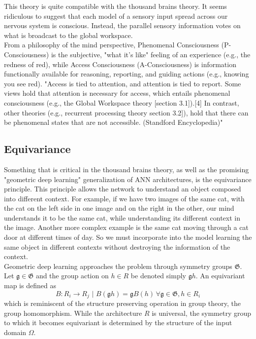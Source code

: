 \documentclass[twocolumn, 10pt]{article}
\begin{document}
This theory is quite compatible with the thousand brains theory. It seems ridiculous to suggest that each model of a sensory input spread across our nervous system is conscious. Instead, the parallel sensory information votes on what is broadcast to the global workspace. \\

From a philosophy of the mind perspective, Phenomenal Consciousness (P-Consciousness) is the subjective, "what it's like" feeling of an experience (e.g., the redness of red), while Access Consciousness (A-Consciousness) is information functionally available for reasoning, reporting, and guiding actions (e.g., knowing you see red). "Access is tied to attention, and attention is tied to report. Some views hold that attention is necessary for access, which entails phenomenal consciousness (e.g., the Global Workspace theory [section 3.1]).[4] In contrast, other theories (e.g., recurrent processing theory section 3.2]), hold that there can be phenomenal states that are not accessible. (Standford Encyclopedia)"

\subsection{Equivariance}
Something that is critical in the thousand brains theory, as well as the promising "geometric deep learning" generalization of ANN architectures, is the equivariance principle. This principle allows the network to understand an object composed into different context. For example, if we have two images of the same cat, with the cat on the left side in one image and on the right in the other, our mind understands it to be the same cat, while understanding its different context in the image. Another more complex example is the same cat moving through a cat door at different times of day. So we must incorporate into the model learning the same object in different contexts without destroying the information of the context. \\

Geometric deep learning approaches the problem through symmetry groups $\mathfrak{G}$. Let $\mathfrak{g} \in \mathfrak{G}$ and the group action on $h \in R$ be denoted simply $\mathfrak{g}h$. An equivariant map is defined as
\begin{equation}
    B : R_i \to R_j \, \, | \, \, B(\mathfrak{g}h) = \mathfrak{g} B(h) \, \forall \mathfrak{g} \in \mathfrak{G}, h \in R_i
\end{equation}
which is reminiscent of the structure preserving operation in group theory, the group homomorphism. While the architecture $R$ is universal, the symmetry group to which it becomes equivariant is determined by the structure of the input domain $\Omega$.
\end{document}
